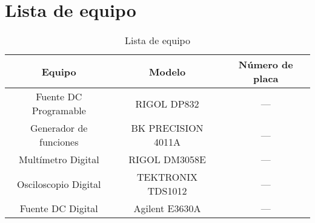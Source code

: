 \newpage
\section{Lista de equipo}

\begin{table}[h!]
\caption{Lista de equipo}\label{t2}
\centering
\begin{tabular}{ccc}
\toprule
\textbf{Equipo}&\textbf{Modelo}&\textbf{Número de placa}\\
 \midrule
Fuente DC Programable   &RIGOL DP832        &---\\
 Generador de funciones &BK PRECISION 4011A &---\\
 Multímetro Digital     &RIGOL DM3058E      &---\\
 Osciloscopio Digital   & TEKTRONIX TDS1012 &---\\
 Fuente DC Digital      &Agilent E3630A     &---\\
 \bottomrule
\end{tabular}
\end{table}